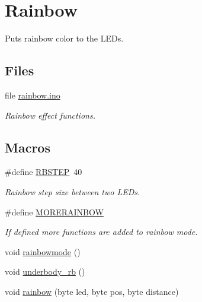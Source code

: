 \hypertarget{group__rainbow}{}\section{Rainbow}
\label{group__rainbow}


Puts rainbow color to the L\+E\+Ds.  


\subsection*{Files}
\begin{DoxyCompactItemize}
\item 
file \hyperlink{rainbow_8ino}{rainbow.\+ino}
\begin{DoxyCompactList}\small\item\em Rainbow effect functions. \end{DoxyCompactList}\end{DoxyCompactItemize}
\subsection*{Macros}
\begin{DoxyCompactItemize}
\item 
\#define \hyperlink{group__rainbow_ga36ae3bd3da884ff03d7306f674f70dea}{R\+B\+S\+T\+EP}~40
\begin{DoxyCompactList}\small\item\em Rainbow step size between two L\+E\+Ds. \end{DoxyCompactList}\item 
\#define \hyperlink{group__rainbow_ga815390be3470e0d4a56652e315c86dd3}{M\+O\+R\+E\+R\+A\+I\+N\+B\+OW}
\begin{DoxyCompactList}\small\item\em If defined more functions are added to rainbow mode. \end{DoxyCompactList}\end{DoxyCompactItemize}
\begin{DoxyCompactItemize}
\item 
void \hyperlink{group__rainbow_ga51e30a1c423190e50127c6651c991612}{rainbowmode} ()
\item 
void \hyperlink{group__rainbow_ga3656f41cfe48a0bf63e63099673ac4c4}{underbody\+\_\+rb} ()
\item 
void \hyperlink{group__rainbow_ga80198b192c269a2b71cfa41654a3aafd}{rainbow} (byte led, byte pos, byte distance)
\end{DoxyCompactItemize}


